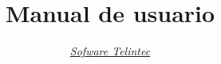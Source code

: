 \documentclass{book}
\begin{document}
\title{Manual de usuario}
\author{\href{mailto:software@telintec.com.mx}{\emph{Sofware Telintec}}
}

\tableofcontents







\end{document}
